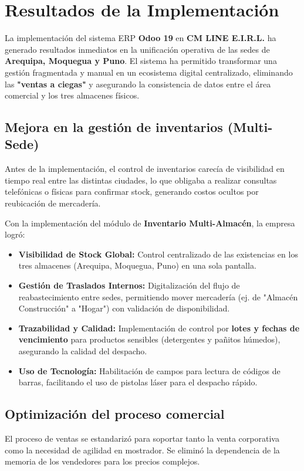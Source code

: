\section{Resultados de la Implementación}

La implementación del sistema ERP \textbf{Odoo 19} en \textbf{CM LINE E.I.R.L.} ha generado resultados inmediatos en la unificación operativa de las sedes de \textbf{Arequipa, Moquegua y Puno}. El sistema ha permitido transformar una gestión fragmentada y manual en un ecosistema digital centralizado, eliminando las \textbf{"ventas a ciegas"} y asegurando la consistencia de datos entre el área comercial y los tres almacenes físicos.

\subsection{Mejora en la gestión de inventarios (Multi-Sede)}
Antes de la implementación, el control de inventarios carecía de visibilidad en tiempo real entre las distintas ciudades, lo que obligaba a realizar consultas telefónicas o físicas para confirmar stock, generando costos ocultos por reubicación de mercadería.

Con la implementación del módulo de \textbf{Inventario Multi-Almacén}, la empresa logró:
\begin{itemize}
    \item \textbf{Visibilidad de Stock Global:} Control centralizado de las existencias en los tres almacenes (Arequipa, Moquegua, Puno) en una sola pantalla.
    \item \textbf{Gestión de Traslados Internos:} Digitalización del flujo de reabastecimiento entre sedes, permitiendo mover mercadería (ej. de "Almacén Construcción" a "Hogar") con validación de disponibilidad.
    \item \textbf{Trazabilidad y Calidad:} Implementación de control por \textbf{lotes y fechas de vencimiento} para productos sensibles (detergentes y pañitos húmedos), asegurando la calidad del despacho.
    \item \textbf{Uso de Tecnología:} Habilitación de campos para lectura de códigos de barras, facilitando el uso de pistolas láser para el despacho rápido.
\end{itemize}

\subsection{Optimización del proceso comercial}
El proceso de ventas se estandarizó para soportar tanto la venta corporativa como la necesidad de agilidad en mostrador. Se eliminó la dependencia de la memoria de los vendedores para los precios complejos.

